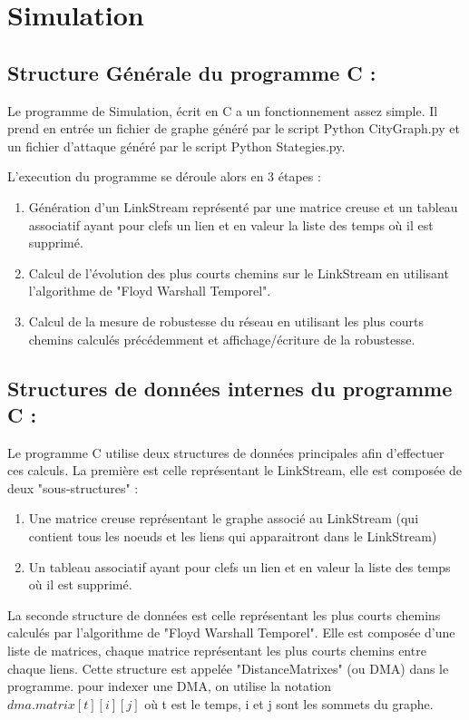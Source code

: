 \section{Simulation}\label{sec:simulation}

\subsection{Structure Générale du programme C :}

Le programme de Simulation, écrit en C a un fonctionnement assez simple. 
Il prend en entrée un fichier de graphe généré par le script Python CityGraph.py et un 
fichier d'attaque généré par le script Python Stategies.py. 

L'execution du programme se déroule alors en 3 étapes :
\begin{enumerate}
    \item Génération d'un LinkStream représenté par une matrice creuse et un tableau associatif ayant pour clefs un lien et en valeur la liste des temps où il est supprimé. 
    \item Calcul de l'évolution des plus courts chemins sur le LinkStream en utilisant l'algorithme de "Floyd Warshall Temporel".
    \item Calcul de la mesure de robustesse du réseau en utilisant les plus courts chemins calculés précédemment et affichage/écriture de la robustesse.
\end{enumerate}

\subsection{Structures de données internes du programme C :}
Le programme C utilise deux structures de données principales afin d'effectuer ces calculs. 
La première est celle représentant le LinkStream, elle est composée de deux "sous-structures" :
\begin{enumerate}
    \item Une matrice creuse représentant le graphe associé au LinkStream (qui contient tous les noeuds et les liens qui apparaitront dans le LinkStream)
    \item Un tableau associatif ayant pour clefs un lien et en valeur la liste des temps où il est supprimé.
\end{enumerate}
La seconde structure de données est celle représentant les plus courts chemins calculés par l'algorithme de "Floyd Warshall Temporel".
Elle est composée d'une liste de matrices, chaque matrice représentant les plus courts chemins entre chaque liens.
Cette structure est appelée "DistanceMatrixes" (ou DMA) dans le programme.
pour indexer une DMA, on utilise la notation $dma.matrix[t][i][j]$ où t est le temps, i et j sont les sommets du graphe.


